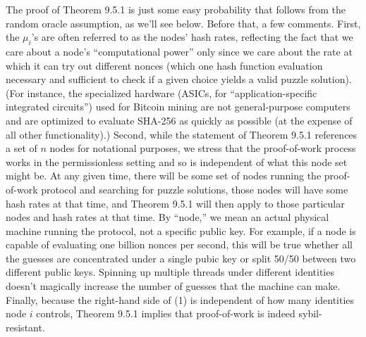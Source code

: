 The proof of Theorem 9.5.1 is just some easy probability that follows from the random oracle
assumption, as we’ll see below. Before that, a few comments. First, the $\mu_i$’s are often referred to as the nodes' hash rates, reflecting the fact that we care about a node’s “computational
power” only since we care about the rate at which it can try out different nonces
(which one hash function evaluation necessary and sufficient to check if a given choice yields
a valid puzzle solution). (For instance, the specialized hardware (ASICs, for “application-specific integrated circuits”) used for
Bitcoin mining are not general-purpose computers and are optimized to evaluate SHA-256 as quickly as
possible (at the expense of all other functionality).) Second, while the statement of Theorem 9.5.1 references a set
of $n$ nodes for notational purposes, we stress that the proof-of-work process works in the
permissionless setting and so is independent of what this node set might be. At any given
time, there will be some set of nodes running the proof-of-work protocol and searching for
puzzle solutions, those nodes will have some hash rates at that time, and Theorem 9.5.1 will
then apply to those particular nodes and hash rates at that time. By “node,” we mean an actual physical machine running the protocol, not a specific public key. For
example, if a node is capable of evaluating one billion nonces per second, this will be true whether all the
guesses are concentrated under a single pubic key or split 50/50 between two different public keys. Spinning
up multiple threads under different identities doesn't magically increase the number of guesses that the
machine can make. Finally, because the
right-hand side of (1) is independent of how many identities node $i$ controls, Theorem 9.5.1
implies that proof-of-work is indeed sybil-resistant.


